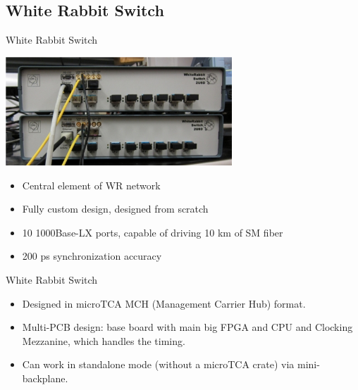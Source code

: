 \documentclass[xcolor=dvipsnames]{beamer}
\begin{document}


\subsection {White Rabbit Switch}


\begin{frame}{White Rabbit Switch}
\begin{center}
\includegraphics[width=8.5cm]{switch/old_switches2.jpg}
\end{center}
\begin{itemize}
\item Central element of WR network
\item Fully custom design, designed from scratch
\item 10 1000Base-LX ports, capable of driving 10 km of SM fiber
\item 200 ps synchronization accuracy
\end{itemize}
\end{frame}

\begin{frame}{White Rabbit Switch}
\begin{itemize}
\item Designed in microTCA MCH (Management Carrier Hub) format.
\item Multi-PCB design: base board with main big FPGA and CPU and Clocking Mezzanine, which handles the timing.
\item Can work in standalone mode (without a microTCA crate) via mini-backplane.
\end{itemize}
\end{frame}
\end{document}

